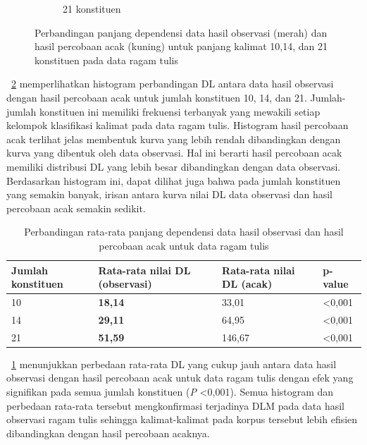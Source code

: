 \begin{figure}
\begin{subfigure}{.45\textwidth}
  \caption{21 konstituen}
  \label{fig:t21randomobs} 
\end{subfigure}

\caption{Perbandingan panjang dependensi data hasil observasi (merah) dan hasil percobaan acak (kuning) untuk panjang kalimat 10,14, dan 21 konstituen pada data ragam tulis}
\label{fig:trandomobs}
\end{figure}

\pic~\ref{fig:trandomobs} memperlihatkan histogram perbandingan DL antara data hasil observasi dengan hasil percobaan acak untuk jumlah konstituen 10, 14, dan 21. Jumlah-jumlah konstituen ini memiliki frekuensi terbanyak yang mewakili setiap kelompok klasifikasi kalimat pada data ragam tulis.  Histogram hasil percobaan acak terlihat jelas membentuk kurva yang lebih rendah dibandingkan dengan kurva yang dibentuk oleh data observasi. Hal ini berarti hasil percobaan acak memiliki distribusi DL yang lebih besar dibandingkan dengan data observasi. Berdasarkan histogram ini, dapat dilihat juga bahwa pada jumlah konstituen yang semakin banyak, irisan antara kurva nilai DL data observasi dan hasil percobaan acak semakin sedikit.

\begin{table}
\begin{center}
\begin{small}
  \caption{Perbandingan rata-rata panjang dependensi data hasil observasi dan hasil percobaan acak untuk data ragam tulis}  \label{tab:perbandingan_DL_tulis}
  \begin{tabular}{ | l | l | l | l |}
    \hline
    	Jumlah konstituen & Rata-rata nilai DL (observasi) & Rata-rata nilai DL (acak) & p-value \\ \hline
	10 & \textbf{18,14} & 33,01 & \textless 0,001 \\ \hline
	14 & \textbf{29,11} & 64,95 & \textless 0,001 \\ \hline
	21 & \textbf{51,59} & 146,67 & \textless 0,001 \\ \hline
  \end{tabular}
  \end{small}
\end{center}
\end{table}

\tab~\ref{tab:perbandingan_DL_tulis} menunjukkan perbedaan rata-rata DL yang cukup jauh antara data hasil observasi dengan hasil percobaan acak untuk data ragam tulis dengan efek yang signifikan pada semua jumlah konstituen (\textit{P} \textless 0,001). Semua histogram dan perbedaan rata-rata tersebut mengkonfirmasi terjadinya DLM pada data hasil observasi ragam tulis sehingga kalimat-kalimat pada korpus tersebut lebih efisien dibandingkan dengan hasil percobaan acaknya.


